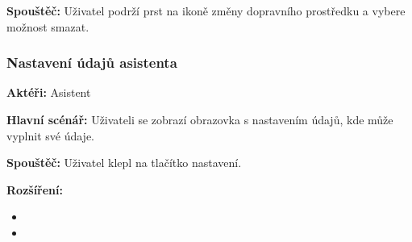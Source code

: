 \documentclass[czech,master,public,dept460,male,java,cpdeclaration]{diploma}
\newcommand{\usecase}[2]{\subsubsection{#1}\label{#2}}
\begin{document}
\vspace{0.1cm}
\noindent
\textbf{Spouštěč:} Uživatel podrží prst na ikoně změny dopravního prostředku a vybere možnost smazat.


\usecase{Nastavení údajů asistenta}{nastaveniudaju}
\textbf{Aktéři:} Asistent

\vspace{0.1cm}
\noindent
\textbf{Hlavní scénář:} Uživateli se zobrazí obrazovka s nastavením údajů, kde může vyplnit své údaje.

\vspace{0.1cm}
\noindent
\textbf{Spouštěč:} Uživatel klepl na tlačítko nastavení.

\vspace{0.1cm}
\noindent
\textbf{Rozšíření:}
\begin{itemize}
  \item {}
  \item {}
\end{itemize}
\end{document}
